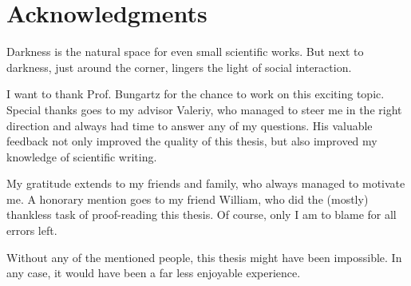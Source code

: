 \thispagestyle{empty}




\renewcommand{\dictumwidth}{\textwidth}
\chapter{Acknowledgments}
\vspace{1em}
Darkness is the natural space for even small scientific works.
But next to darkness, just around the corner, lingers the light of social interaction.

I want to thank Prof. Bungartz for the chance to work on this exciting topic.
Special thanks goes to my advisor Valeriy, who managed to steer me in the right direction and always had time to answer any of my questions.
His valuable feedback not only improved the quality of this thesis, but also
improved my knowledge of scientific writing.

My gratitude extends to my friends and family, who always managed to motivate me.
A honorary mention goes to my friend William, who did the (mostly) thankless task of proof-reading this thesis.
Of course, only I am to blame for all errors left.

Without any of the mentioned people, this thesis might have been impossible.
In any case, it would have been a far less enjoyable experience.
\cleardoublepage{}

